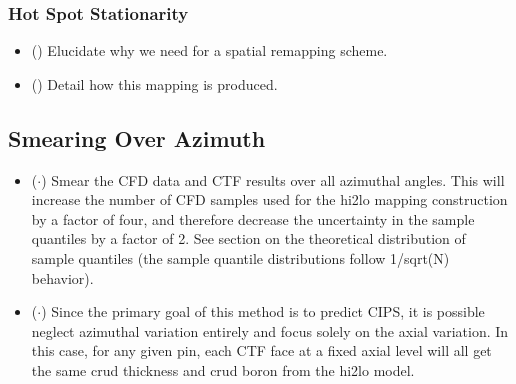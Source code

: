 \subsubsection{Hot Spot Stationarity}
\begin{itemize}
	\item (\checkmark) Elucidate why we need for a spatial remapping scheme.
	\item (\checkmark) Detail how this mapping is produced.
\end{itemize}

\subsection{Smearing Over Azimuth}

\begin{itemize}
	\item ($\cdot$) Smear the CFD data and CTF results over all azimuthal angles.  This will increase the number of CFD samples used for the hi2lo mapping construction by a factor of four, and therefore decrease the uncertainty in the sample quantiles by a factor of 2.  See section on the theoretical distribution of sample quantiles (the sample quantile distributions follow 1/sqrt(N) behavior).
	\item ($\cdot$) Since the primary goal of this method is to predict CIPS, it is possible neglect azimuthal variation entirely and focus solely on the axial variation.  In this case, for any given pin, each CTF face at a fixed axial level will all get the same crud thickness and crud boron from the hi2lo model.
\end{itemize}